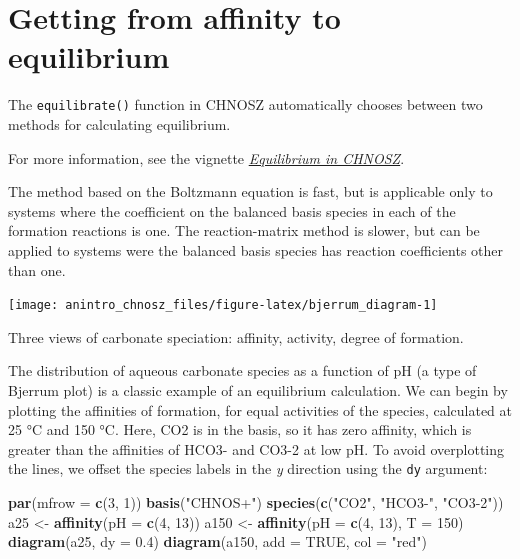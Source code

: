 \documentclass[]{tufte-book}
\newenvironment{Shaded}{}{}
\newcommand{\KeywordTok}[1]{\textcolor[rgb]{0.00,0.44,0.13}{\textbf{#1}}}
\newcommand{\DataTypeTok}[1]{\textcolor[rgb]{0.56,0.13,0.00}{#1}}
\newcommand{\DecValTok}[1]{\textcolor[rgb]{0.25,0.63,0.44}{#1}}
\newcommand{\FloatTok}[1]{\textcolor[rgb]{0.25,0.63,0.44}{#1}}
\newcommand{\StringTok}[1]{\textcolor[rgb]{0.25,0.44,0.63}{#1}}
\newcommand{\OtherTok}[1]{\textcolor[rgb]{0.00,0.44,0.13}{#1}}
\newcommand{\NormalTok}[1]{#1}
\begin{document}
\section{Getting from affinity to
equilibrium}\label{getting-from-affinity-to-equilibrium}

The {\texttt{equilibrate()}} function in CHNOSZ automatically chooses
between two methods for calculating equilibrium.

\begin{marginfigure}
For more information, see the vignette
\href{equilibrium.pdf}{{\emph{Equilibrium in CHNOSZ}}}.
\end{marginfigure}

The method based on the Boltzmann equation is fast, but is applicable
only to systems where the coefficient on the balanced basis species in
each of the formation reactions is one. The reaction-matrix method is
slower, but can be applied to systems were the balanced basis species
has reaction coefficients other than one.

\begin{marginfigure}
\texttt{[image: anintro\_chnosz\_files/figure-latex/bjerrum\_diagram-1]} \caption[Three views of carbonate speciation]{Three views of carbonate speciation: affinity, activity, degree of formation.}\label{fig:bjerrum_diagram}
\end{marginfigure}

The distribution of aqueous carbonate species as a function of pH (a
type of Bjerrum plot) is a classic example of an equilibrium
calculation. We can begin by plotting the affinities of formation, for
equal activities of the species, calculated at 25 °C and 150 °C. Here,
CO2 is in the basis, so it has zero affinity, which is greater than the
affinities of HCO3- and CO3-2 at low pH. To avoid overplotting the
lines, we offset the species labels in the \emph{y} direction using the
\texttt{dy} argument:

\begin{Shaded}
\begin{Highlighting}[]
\KeywordTok{par}\NormalTok{(}\DataTypeTok{mfrow =} \KeywordTok{c}\NormalTok{(}\DecValTok{3}\NormalTok{, }\DecValTok{1}\NormalTok{))}
\KeywordTok{basis}\NormalTok{(}\StringTok{"CHNOS+"}\NormalTok{)}
\KeywordTok{species}\NormalTok{(}\KeywordTok{c}\NormalTok{(}\StringTok{"CO2"}\NormalTok{, }\StringTok{"HCO3-"}\NormalTok{, }\StringTok{"CO3-2"}\NormalTok{))}
\NormalTok{a25 <-}\StringTok{ }\KeywordTok{affinity}\NormalTok{(}\DataTypeTok{pH =} \KeywordTok{c}\NormalTok{(}\DecValTok{4}\NormalTok{, }\DecValTok{13}\NormalTok{))}
\NormalTok{a150 <-}\StringTok{ }\KeywordTok{affinity}\NormalTok{(}\DataTypeTok{pH =} \KeywordTok{c}\NormalTok{(}\DecValTok{4}\NormalTok{, }\DecValTok{13}\NormalTok{), }\DataTypeTok{T =} \DecValTok{150}\NormalTok{)}
\KeywordTok{diagram}\NormalTok{(a25, }\DataTypeTok{dy =} \FloatTok{0.4}\NormalTok{)}
\KeywordTok{diagram}\NormalTok{(a150, }\DataTypeTok{add =} \OtherTok{TRUE}\NormalTok{, }\DataTypeTok{col =} \StringTok{"red"}\NormalTok{)}
\end{Highlighting}
\end{Shaded}
\end{document}
